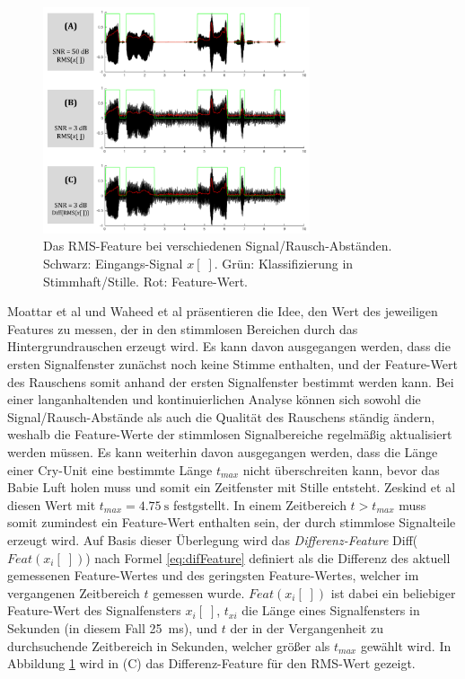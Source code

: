 \begin{figure}[h]
	\centering
	\includegraphics[width=0.7\textwidth]{bilder/rms_diff.png}
	\caption{Das RMS-Feature bei verschiedenen Signal/Rausch-Abständen. Schwarz: Eingangs-Signal $x[\;]$. Grün: Klassifizierung in Stimmhaft/Stille. Rot: Feature-Wert.}
	\label{img:min-signal}
\end{figure}

Moattar et al \cite{vad_Easy} und Waheed et al \cite{vad_entropy} präsentieren die Idee, den Wert des jeweiligen Features zu messen, der in den stimmlosen Bereichen durch das Hintergrundrauschen erzeugt wird. Es kann davon ausgegangen werden, dass die ersten Signalfenster zunächst noch keine Stimme enthalten, und der Feature-Wert des Rauschens somit anhand der ersten Signalfenster bestimmt werden kann. Bei einer langanhaltenden und kontinuierlichen Analyse können sich sowohl die Signal/Rausch-Abstände als auch die Qualität des Rauschens ständig ändern, weshalb die Feature-Werte der stimmlosen Signalbereiche regelmäßig aktualisiert werden müssen. Es kann weiterhin davon ausgegangen werden, dass die Länge einer Cry-Unit eine bestimmte Länge $t_{max}$ nicht überschreiten kann, bevor das Babie Luft holen muss und somit ein Zeitfenster mit Stille entsteht. Zeskind et al \cite[S. 325]{rythmic} diesen Wert mit $t_{max} = \SI{4.75}{\second}$ festgstellt. In einem Zeitbereich $ t > t_{max}$ muss somit zumindest ein Feature-Wert enthalten sein, der durch stimmlose Signalteile erzeugt wird. Auf Basis dieser Überlegung wird das \emph{Differenz-Feature} Diff($Feat(x_i[\;])$) nach Formel \ref{eq:difFeature} definiert als die Differenz des aktuell gemessenen Feature-Wertes und des geringsten Feature-Wertes, welcher im vergangenen Zeitbereich $t$ gemessen wurde. $Feat(x_i[\;])$ ist dabei ein beliebiger Feature-Wert des Signalfensters $x_i[\;]$, $t_{xi}$ die Länge eines Signalfensters in Sekunden (in diesem Fall \SI{25}{\milli\second}), und $t$ der in der Vergangenheit zu durchsuchende Zeitbereich in Sekunden, welcher größer als $t_{max}$ gewählt wird. In Abbildung \ref{img:min-signal} wird in (C) das Differenz-Feature für den RMS-Wert gezeigt.

